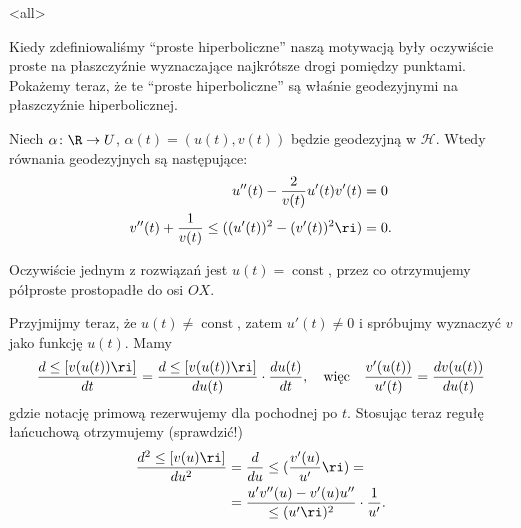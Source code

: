 \mode<all>{}


Kiedy zdefiniowaliśmy ``proste hiperboliczne'' naszą motywacją były oczywiście proste na płaszczyźnie wyznaczające najkrótsze drogi pomiędzy punktami. Pokażemy teraz, że te ``proste hiperboliczne'' są właśnie geodezyjnymi na płaszczyźnie hiperbolicznej.

\begin{frame}

Niech $\alpha\colon \R\to U$, $\alpha(t)=(u(t),v(t))$ będzie geodezyjną w $\mathcal{H}$. Wtedy równania geodezyjnych są następujące:
\begin{align*}
u''(t)-\frac{2}{v(t)}u'(t)v'(t)&=0\\
v''(t)+\frac{1}{v(t)}\le((u'(t))^2-(v'(t))^2\ri)&=0.
\end{align*}

\pause Oczywiście jednym z rozwiązań jest $u(t)=\operatorname{const}$, przez co otrzymujemy półproste prostopadłe do osi $OX$.

\pause\begin{exercise}
\end{exercise}

\end{frame}
\begin{frame}

Przyjmijmy teraz, że $u(t)\neq \operatorname{const}$, zatem $u'(t)\neq 0$ i spróbujmy wyznaczyć $v$ jako funkcję $u(t)$. Mamy \[\frac{d \le[v(u(t))\ri]}{dt}=\frac{d\le[v(u(t))\ri]}{du(t)}\cdot\frac{du(t)}{dt}, \quad\text{więc}\quad\frac{v'(u(t))}{u'(t)}=\frac{dv(u(t))}{du(t)}\] gdzie notację primową rezerwujemy dla pochodnej po $t$. \pause Stosując teraz regułę łańcuchową otrzymujemy (sprawdzić!)
\begin{align*}
\frac{d^2\le[v(u)\ri]}{d u^2}&= \frac{d}{du}\le(\frac{v'(u)}{u'}\ri)=\\
&=\frac{u'v''(u)-v'(u)u''}{\le(u'\ri)^2}\cdot\frac{1}{u'}.\end{align*}

\end{frame}

